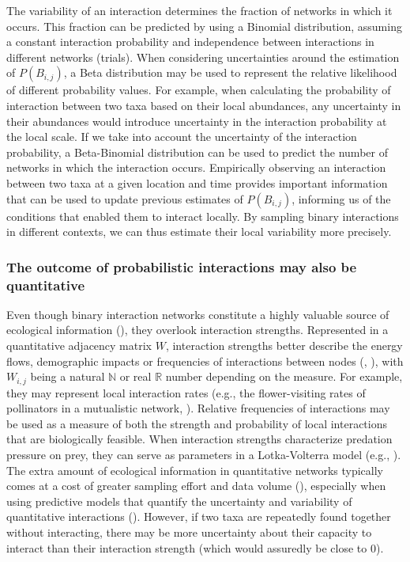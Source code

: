 The variability of an interaction determines the fraction of networks in which
it occurs. This fraction can be predicted by using a Binomial distribution,
assuming a constant interaction probability and independence between
interactions in different networks (trials). When considering uncertainties
around the estimation of $P(B_{i, j})$, a Beta distribution may be used to
represent the relative likelihood of different probability values. For example,
when calculating the probability of interaction between two taxa based on their
local abundances, any uncertainty in their abundances would introduce
uncertainty in the interaction probability at the local scale. If we take into
account the uncertainty of the interaction probability, a Beta-Binomial
distribution can be used to predict the number of networks in which the
interaction occurs. Empirically observing an interaction between two taxa at a
given location and time provides important information that can be used to
update previous estimates of $P(B_{i, j})$, informing us of the conditions that
enabled them to interact locally. By sampling binary interactions in different
contexts, we can thus estimate their local variability more precisely. 

\subsubsection{The outcome of probabilistic interactions may also be quantitative}

Even though binary interaction networks constitute a highly valuable source of
ecological information (\cite{Pascual2006Ecological}), they overlook interaction
strengths. Represented in a quantitative adjacency matrix $W$, interaction
strengths better describe the energy flows, demographic impacts or frequencies
of interactions between nodes (\cite{Berlow2004Interaction},
\cite{Borrett2019Walk}), with $W_{i, j}$ being a natural $\mathbb{N}$ or real
$\mathbb{R}$ number depending on the measure. For example, they may represent
local interaction rates (e.g., the flower-visiting rates of pollinators in a
mutualistic network, \cite{Herrera1989Pollinator}). Relative frequencies of
interactions may be used as a measure of both the strength and probability of
local interactions that are biologically feasible. When interaction strengths
characterize predation pressure on prey, they can serve as parameters in a
Lotka-Volterra model (e.g., \cite{Emmerson2004Predatorprey}). The extra amount
of ecological information in quantitative networks typically comes at a cost of
greater sampling effort and data volume (\cite{Strydom2021Roadmapa}), especially
when using predictive models that quantify the uncertainty and variability of
quantitative interactions (\cite{Berlow2004Interaction}). However, if two taxa
are repeatedly found together without interacting, there may be more uncertainty
about their capacity to interact than their interaction strength (which would
assuredly be close to $0$).

